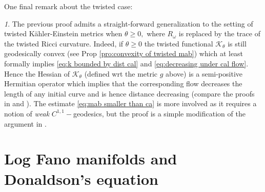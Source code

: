 \documentclass[11pt,oneside,english]{amsart}
\numberwithin{equation}{section}
\numberwithin{figure}{section}
\theoremstyle{plain}
\theoremstyle{plain}
\theoremstyle{plain}
\theoremstyle{plain}
\theoremstyle{remark}
\newtheorem{rem}[thm]{\protect\remarkname}
\theoremstyle{definition}
\providecommand{\remarkname}{Remark}
\begin{document}
One final remark about the twisted case:
\begin{rem}
\label{rem:twisted calabi flow}The previous proof admits a straight-forward
generalization to the setting of twisted Kähler-Einstein metrics when
$\theta\geq0,$ where $R_{\omega}$ is replaced by the trace of the
twisted Ricci curvature. Indeed, if $\theta\geq0$ the twisted functional
$\mathcal{K}_{\theta}$ is still geodesically convex (see Prop \ref{pro:convexity of twisted mab})
which at least formally implies \ref{eq:k bounded by dist cal} and
\ref{eq:decreasing under cal flow}. Hence the Hessian of $\mathcal{K}_{\theta}$
(defined wrt the metric $g$ above) is a semi-positive Hermitian operator
which implies that the corresponding flow decreases the length of
any initial curve and is hence distance decreasing (compare the proofs
in \cite{ca-ch} and \cite{ch3}). The estimate \ref{eq:mab smaller than ca}
is more involved as it requires a notion of \emph{weak} $C^{1,1}-$geodesics,
but the proof is a simple modification of the argument in \cite{chen}. 
\end{rem}

\section{\label{sub:K=00003D0000E4hler-Einstein-metrics-on log} Log Fano
manifolds and Donaldson's equation}
\end{document}
